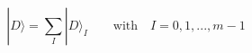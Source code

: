 \begin{equation}
\label{breirn}
|D\rangle = \sum_I |D\rangle_I \qquad \mbox{with}\quad I=0,1,..., m-1
\end{equation}

